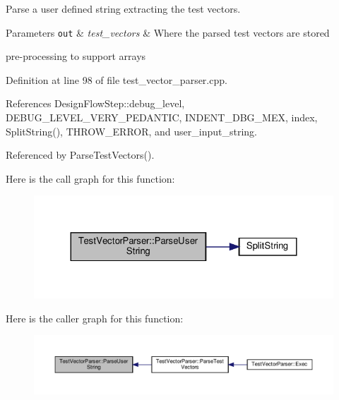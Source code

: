 Parse a user defined string extracting the test vectors. 


\begin{DoxyParams}[1]{Parameters}
\mbox{\tt out}  & {\em test\+\_\+vectors} & Where the parsed test vectors are stored \\
\hline
\end{DoxyParams}
pre-\/processing to support arrays 

Definition at line 98 of file test\+\_\+vector\+\_\+parser.\+cpp.



References Design\+Flow\+Step\+::debug\+\_\+level, D\+E\+B\+U\+G\+\_\+\+L\+E\+V\+E\+L\+\_\+\+V\+E\+R\+Y\+\_\+\+P\+E\+D\+A\+N\+T\+IC, I\+N\+D\+E\+N\+T\+\_\+\+D\+B\+G\+\_\+\+M\+EX, index, Split\+String(), T\+H\+R\+O\+W\+\_\+\+E\+R\+R\+OR, and user\+\_\+input\+\_\+string.



Referenced by Parse\+Test\+Vectors().

Here is the call graph for this function\+:
\nopagebreak
\begin{figure}[H]
\begin{center}
\leavevmode
\includegraphics[width=324pt]{d8/d4e/classTestVectorParser_a92e072b1028880a427b199a32b020f23_cgraph}
\end{center}
\end{figure}
Here is the caller graph for this function\+:
\nopagebreak
\begin{figure}[H]
\begin{center}
\leavevmode
\includegraphics[width=350pt]{d8/d4e/classTestVectorParser_a92e072b1028880a427b199a32b020f23_icgraph}
\end{center}
\end{figure}
\mbox{\label{classTestVectorParser_a0509f3e5b9c496651e6d896ce8d099c0}} 
